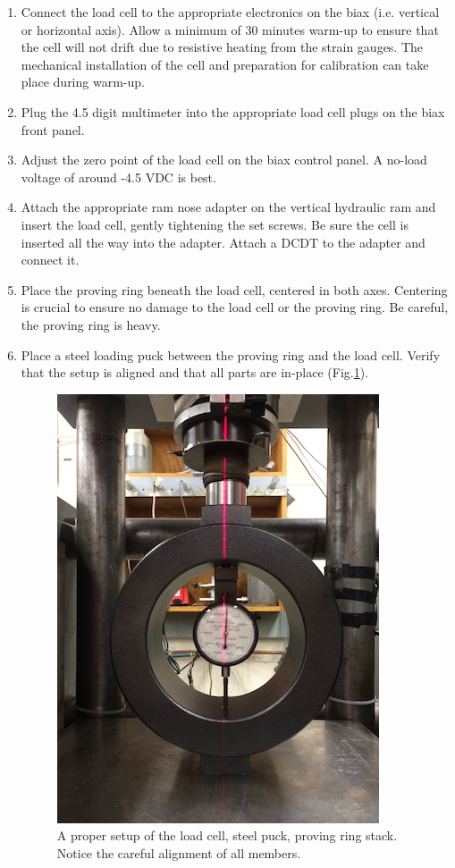 \begin{enumerate}
\item Connect the load cell to the appropriate electronics on the biax (i.e.
    vertical or horizontal axis). Allow a minimum of 30 minutes warm-up to
    ensure that the cell will not drift due to resistive heating from the
    strain gauges. The mechanical installation of the cell and preparation 
    for calibration can take place during warm-up. 
    
\item Plug the 4.5 digit multimeter into the appropriate load cell plugs on the
    biax front panel. 
    
\item  Adjust the zero point of the load cell on the biax control panel. A no-load
    voltage of around -4.5 VDC is best.
    
\item Attach the appropriate ram nose adapter on the vertical hydraulic ram and 
    insert the load cell, gently tightening the set screws. Be sure the cell
    is inserted all the way into the adapter. Attach a DCDT to the adapter and
    connect it.
    
\item Place the proving ring beneath the load cell, centered in both axes. Centering
    is crucial to ensure no damage to the load cell or the proving ring. Be 
    careful, the proving ring is heavy.
    
\item Place a steel loading puck between the proving ring and the load cell. Verify
    that the setup is aligned and that all parts are in-place (Fig.\ref{ring_setup}).

\begin{figure}
	\centering
		\includegraphics[scale=0.35]{appendix_load_calibration/load_cal.jpg}
   	\caption{A proper setup of the load cell, steel puck, proving ring stack. Notice the careful alignment of all members.}
  	\label{ring_setup}
\end{figure}


\end{enumerate}
